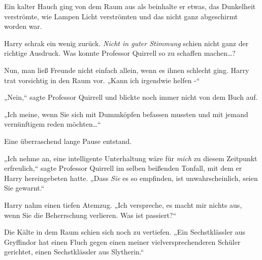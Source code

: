 Ein kalter Hauch ging von dem Raum aus als beinhalte er etwas, das Dunkelheit verströmte, wie Lampen Licht verströmten und das nicht ganz abgeschirmt worden war.

Harry schrak ein wenig zurück. \emph{Nicht in guter Stimmung} schien nicht ganz der richtige Ausdruck. Was konnte Professor Quirrell so zu schaffen machen…?

Nun, man ließ Freunde nicht einfach allein, wenn es ihnen schlecht ging. Harry trat vorsichtig in den Raum vor. „Kann ich irgendwie helfen -“

„Nein,“ sagte Professor Quirrell und blickte noch immer nicht von dem Buch auf.


„Ich meine, wenn Sie sich mit Dummköpfen befassen mussten und mit jemand vernünftigem reden möchten…“

Eine überraschend lange Pause entstand.

„Ich nehme an, eine intelligente Unterhaltung wäre für \emph{mich} zu diesem Zeitpunkt erfreulich,“ sagte Professor Quirrell im selben beißenden Tonfall, mit dem er Harry hereingebeten hatte. „Dass \emph{Sie} es so empfinden, ist unwahrscheinlich, seien Sie gewarnt.“

Harry nahm einen tiefen Atemzug. „Ich verspreche, es macht mir nichts aus, wenn Sie die Beherrschung verlieren. Was ist passiert?“

Die Kälte in dem Raum schien sich noch zu vertiefen. „Ein Sechstklässler aus Gryffindor hat einen Fluch gegen einen meiner vielversprechenderen Schüler gerichtet, einen Sechstklässler aus Slytherin.“

